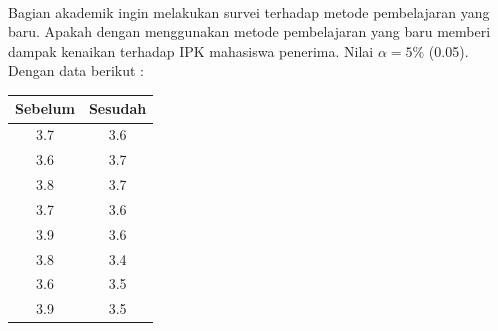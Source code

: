 \documentclass[a4paper,12pt]{article}
\begin{document}
\paragraph{}
Bagian akademik ingin melakukan survei terhadap metode  pembelajaran yang baru. Apakah dengan menggunakan metode pembelajaran yang baru memberi dampak kenaikan terhadap IPK mahasiswa penerima.
Nilai $\alpha = 5\%$ (0.05). Dengan data berikut :
\begin{table}[!ht]
    \centering 
\begin{tabular}{|c|c|}
\hline
Sebelum & Sesudah \\ \hline
3.7     & 3.6     \\ \hline
3.6     & 3.7     \\ \hline
3.8     & 3.7     \\ \hline
3.7     & 3.6     \\ \hline
3.9     & 3.6     \\ \hline
3.8     & 3.4     \\ \hline
3.6     & 3.5     \\ \hline
3.9     & 3.5     \\ \hline
\end{tabular}
\end{table}
\end{document}

